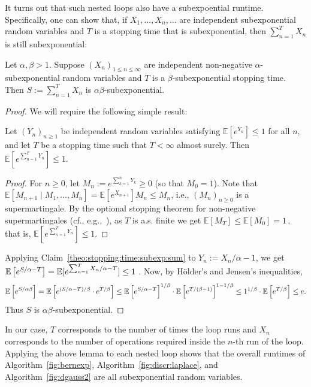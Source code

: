 \documentclass{jpcfinal} %
\newcommand{\ex}[2]{{\ifx&#1& \mathbb{E} \else
\underset{#1}{\mathbb{E}} \fi \left[#2\right]}}
\newcommand{\eqdef}{:=}
\begin{document}
It turns out that such nested loops also have a subexpoential runtime. Specifically, one can show that, if $X_1,\dots,X_n,\dots$ are independent subexponential random variables and $T$ is a stopping time that is subexponential, then $\sum_{n=1}^T X_n$ is still subexponential:
\begin{lem}
Let $\alpha,\beta>1$.
Suppose $(X_n)_{1\leq n\leq \infty}$ are independent non-negative $\alpha$-subexponential random variables and $T$ is a $\beta$-subexponential stopping time. Then $S \eqdef \sum_{n=1}^T X_n$ is $\alpha\beta$-subexponential.
\end{lem}
\begin{proof}
We will require the following simple result:
\begin{clm}
  \label{theo:stopping:time:subexp:sum}
Let $(Y_n)_{n\geq 1}$ be independent random variables satisfying $\mathbb{E}[e^{Y_n}] \leq 1$ for all $n$, and let $T$ be a stopping time such that $T < \infty$ almost surely. Then $\mathbb{E}[e^{\sum_{n=1}^T Y_n}] \leq 1$.
\end{clm}
\begin{proof}
    For $n\geq 0$, let $M_n \eqdef e^{\sum_{k=1}^n Y_k} \geq 0$ (so that $M_0=1$). Note that 
    $
      \mathbb{E}[ M_{n+1} \mid M_1,\dots, M_n ] = \mathbb{E}[ e^{X_{n+1}} ] M_n \leq M_n
    $, i.e., $(M_n)_{n\geq 0}$ is a supermartingale. By the optional stopping theorem for non-negative supermartingales (cf., e.g.,~\cite[Corollary~10.10(d)]{Williams91}), as $T$ is a.s. finite we get
    $
        \mathbb{E}[ M_T ] \leq \mathbb{E}[ M_0 ] = 1 \,,
    $
    that is, $\mathbb{E}[ e^{\sum_{n=1}^T Y_n} ] \leq 1$.
\end{proof}
Applying Claim~\ref{theo:stopping:time:subexp:sum} to $Y_n \eqdef X_n/\alpha-1$, we get
$
    \ex{}{e^{S/\alpha-T}}=\mathbb{E}[ e^{\sum_{n=1}^T X_n/\alpha - T} ] \leq 1
$ 
. 
Now, by H\"older's and Jensen's inequalities,
\[
    \ex{}{e^{S/\alpha\beta}} = \ex{}{e^{(S/\alpha-T)/\beta} \cdot e^{T/\beta}} \le \ex{}{e^{S/\alpha-T}}^{1/\beta} \cdot \ex{}{e^{T/(\beta-1)}}^{1-1/\beta} \le 1^{1/\beta} \cdot \ex{}{e^{T/\beta}} \le e.
\]
Thus $S$ is $\alpha\beta$-subexponential.
\end{proof}
In our case, $T$ corresponds to the number of times the loop runs and $X_n$ corresponds to the number of operations required inside the $n$-th run of the loop. Applying the above lemma to each nested loop shows that the overall runtimes of Algorithm~\ref{fig:bernexp}, Algorithm~\ref{fig:discr:laplace}, and Algorithm~\ref{fig:dgauss2} are all subexponential random variables.
\end{document}
